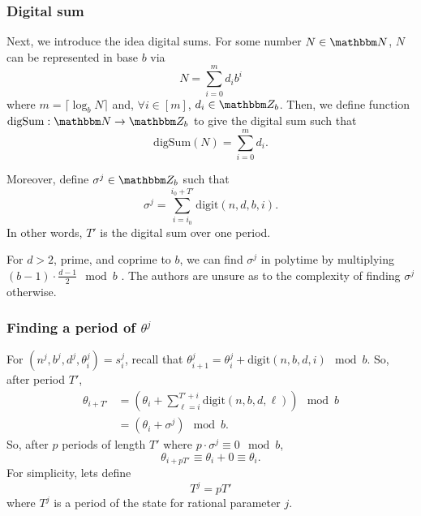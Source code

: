\documentclass[11pt,titlepage]{article}
\newcommand{\rationalPeriodTotal}{{T}'}
\newcommand{\rationalAngle}[1]{{\theta^j_{#1}}}
\newcommand{\rationalAngleNotime}{{\theta}^j}
\newcommand{\digSumPeriodic}{\sigma^j}
\begin{document}
\subsubsection{Digital sum}
Next, we introduce the idea digital sums.
For some number $N \in \N$, $N$ can be represented in base $b$ via
\begin{equation}
  N = \sum_{i=0}^{m} d_i b^i
\end{equation}
where $m = \lceil \log_b N \rceil$ and, $\forall i \in [m]$, $d_i \in \Z_b$.
Then, we define function $\mathrm{digSum}: \N \rightarrow \Z_b$
to give the digital sum such that
\begin{equation}
  \mathrm{digSum}(N) = \sum_{i=0}^{m} d_i.
\end{equation}

Moreover, define $\digSumPeriodic \in \Z_b$
such that
\begin{equation}
  \digSumPeriodic = \sum_{i = i_0}^{i_0 + \rationalPeriodTotal} \mathrm{digit}(n, d, b, i).
\end{equation}
In other words, $\rationalPeriodTotal$ is the digital sum over one period.

\begin{remark}[Complexity]
  For $d > 2$, prime, and coprime to $b$, we can find $\digSumPeriodic$
  in polytime by multiplying $(b - 1) \cdot \frac{d-1}{2} \mod b$ \cite{OnDecSeq}. The authors are unsure
  as to the complexity of finding $\digSumPeriodic$ otherwise.
\end{remark}

\subsubsection{Finding a period of $\rationalAngleNotime$} %
For $(n^j, b^j, d^j, \theta_i^j) = s_i^j$,
recall that $\rationalAngle{i + 1} = \rationalAngle{i} + \mathrm{digit}(n, b, d, i) \mod b$.
So, after period $\rationalPeriodTotal$,
\begin{align*}
  \theta_{i + \rationalPeriodTotal} &= \left(\theta_{i} + \sum_{\ell = i}^{\rationalPeriodTotal + i} \mathrm{digit}(n, b, d, \ell)\right) \mod b\\
  &= \left(\theta_{i} +  \digSumPeriodic\right) \mod b.
\end{align*}
So, after $p$ periods of length $\rationalPeriodTotal$ where $p  \cdot \digSumPeriodic \equiv 0 \mod b$,
$$
\theta_{i + p\rationalPeriodTotal} \equiv \theta_i + 0 \equiv \theta_i.
$$
For simplicity, lets define
$$
  T^j = p\rationalPeriodTotal
$$
where $T^j$ is a period of the state for rational parameter $j$.
\end{document}
